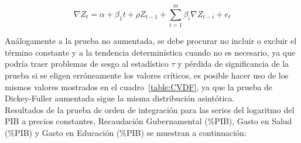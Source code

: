   \begin{equation}
 \nabla Z_t= \alpha + \beta_1 t + \rho Z_{t-1} + \sum_{i=1}^{m} \beta_i \nabla Z_{t-i} + e_t
 \end{equation}


Análogamente a la prueba no aumentada, se debe procurar no incluir o excluir el término constante y a la tendencia determinística cuando no es necesario, ya que podría traer problemas de sesgo al estadístico $\tau$ y pérdida de significancia de la prueba si se eligen erróneamente los valores críticos, es posible hacer uso de los mismos valores mostrados en el cuadro~\ref{table:CVDF}, ya que la prueba de Dickey-Fuller aumentada sigue la misma distribución asintótica.  \\


Resultados de la prueba de orden de integración para las series del logaritmo del PIB a precios constantes, Recaudación Gubernamental (\%PIB), Gasto en Salud (\%PIB) y Gasto en Educación (\%PIB) se muestran a continuación:



